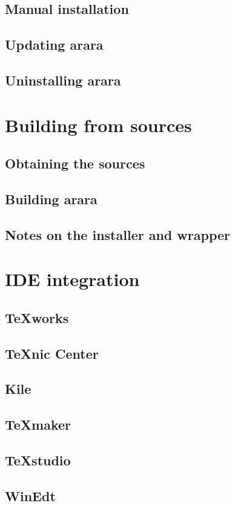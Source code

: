 \documentclass[a4paper,twoside,12pt]{memoir}
\begin{document}
\section{Manual installation}
\section{Updating arara}
\section{Uninstalling arara}

\chapter{Building from sources}
\section{Obtaining the sources}
\section{Building arara}
\section{Notes on the installer and wrapper}

\chapter{IDE integration}
\section{TeXworks}
\section{TeXnic Center}
\section{Kile}
\section{TeXmaker}
\section{TeXstudio}
\section{WinEdt}
\end{document}
